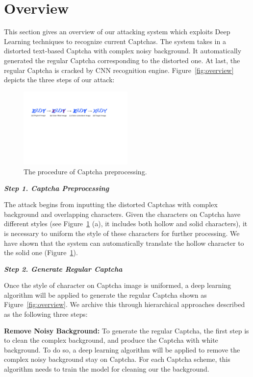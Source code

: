 \section{Overview}

This section gives an overview of our attacking system which exploits Deep Learning techniques to recognize current Captchas. The system takes in a distorted text-based Captcha with complex noisy background. It automatically generated the regular Captcha corresponding to the distorted one. At last, the regular Captcha is cracked by CNN recognition engine. Figure~\ref{fig:overview} depicts the three steps of our attack:

\begin{figure}
  \centering
  \includegraphics[width=0.5\textwidth]{fig/fill_color.pdf}
  \caption{The procedure of Captcha preprocessing.}
  \label{fig:fill_color}
\end{figure}

\noindent \textbf{\emph{Step 1. Captcha Preprocessing}}

The attack begins from inputting the distorted Captchas with complex background and overlapping characters. Given the characters on Captcha have different styles (see Figure~\ref{fig:fill_color} (a), it includes both hollow and solid characters), it is necessary to uniform the style of these characters for further processing. We have shown that the system can automatically translate the hollow character to the solid one (Figure~\ref{fig:fill_color}).

\noindent \textbf{\emph{Step 2. Generate Regular Captcha}}

Once the style of character on Captcha image is uniformed, a deep learning algorithm will be applied to generate the regular Captcha shown as Figure~\ref{fig:overview}. We archive this through hierarchical approaches described as the following three steps:

\noindent \circling{\textcolor{white}{1}} \textbf{Remove Noisy Background:}  To generate the regular Captcha, the first step is to clean the complex background, and produce the Captcha with white background.
To do so, a deep learning algorithm will be applied to remove the complex noisy background stay on Captcha.
For each Captcha scheme, this algorithm needs to train the model for cleaning our the background.

